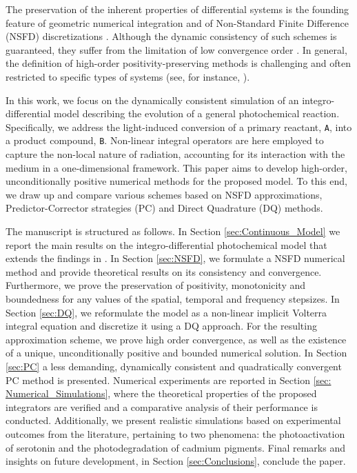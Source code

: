 \documentclass[a4paper, UKenglish, numberwithinsect, thm-restate]{tgdk-v2021}
\begin{document}
The preservation of the inherent properties of differential systems is the founding feature of geometric numerical integration \cite{Hairer_2006,GeCO_Izgin,GeC01} and of Non-Standard Finite Difference (NSFD) discretizations \cite{Lubuma_Chem,Conte2022,Mickens_Book,Patidar02062016}. Although the dynamic consistency of such schemes is guaranteed, they suffer from the limitation of low convergence order \cite{Bolley1978,Hoang03102023,NSFD_High}. In general, the definition of high-order positivity-preserving methods is challenging and often restricted to specific types of systems (see, for instance, \cite{PDS,MPV_Axioms,MPV_mixing,OFFNER202015}).

In this work, we focus on the dynamically consistent simulation of an integro-differential model describing the evolution of a general photochemical reaction. Specifically, we address the light-induced conversion of a primary reactant, \texttt{A}, into a product compound, \texttt{B}. Non-linear integral operators are here employed to capture the non-local nature of radiation, accounting for its interaction with the medium in a one-dimensional framework. This paper aims to develop high-order, unconditionally positive numerical methods for the proposed model. To this end, we draw up and compare various schemes based on NSFD approximations, Predictor-Corrector strategies (PC) and Direct Quadrature (DQ) methods.

The manuscript is structured as follows. In Section \ref{sec:Continuous_Model} we report the main results on the integro-differential photochemical model that extends the findings in \cite{Ceseri_Natalini_Pezzella}. In Section \ref{sec:NSFD}, we formulate a NSFD numerical method and provide theoretical results on its consistency and convergence. Furthermore, we prove the preservation of positivity, monotonicity and boundedness for any values of the spatial, temporal and frequency stepsizes. In Section \ref{sec:DQ}, we reformulate the model as a non-linear implicit Volterra integral equation \cite{MPV_implicit} and discretize it using a DQ approach. For the resulting approximation scheme, we prove high order convergence, as well as the existence of a unique, unconditionally positive and bounded numerical solution. In Section \ref{sec:PC} a less demanding, dynamically consistent and quadratically convergent PC method is presented. Numerical experiments are reported in Section \ref{sec: Numerical_Simulations}, where the theoretical properties of the proposed integrators are verified and a comparative analysis of their performance is conducted. Additionally, we present realistic simulations based on experimental outcomes from the literature, pertaining to two phenomena: the photoactivation of serotonin and the photodegradation of cadmium pigments. Final remarks and insights on future development, in Section \ref{sec:Conclusions}, conclude the paper.
\end{document}
